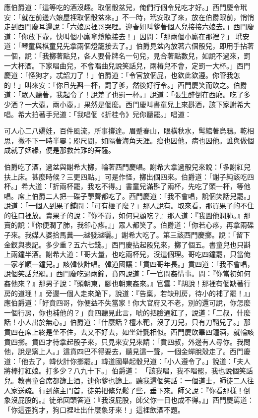應伯爵道：「這等吃的酒沒趣。取個骰盆兒，俺們行個令兒吃才好。」西門慶令玳安：「就在前邊六娘屋裡取個骰盆來。」不一時，玳安取了來，放在伯爵跟前，悄悄走到西門慶耳邊說：「六娘房裡哥哭哩。迎春姐叫爹著個人兒接接六娘去。」西門慶道：「你放下壺，快叫個小廝拿燈籠接去！」因問：「那兩個小廝在那裡？」 玳安道：「琴童與棋童兒先拿兩個燈籠接去了。」伯爵見盆內放著六個骰兒，即用手拈著一個，說：「我擲著點兒，各人要骨牌名一句兒，見合著點數兒，如說不過來，罰一大杯酒。下家唱曲兒，不會唱曲兒說笑話兒，兩樁兒不會，定罰一大杯。」西門慶道：「怪狗才，忒韶刀了！」伯爵道：「令官放個屁，也欽此欽遵。你管我怎的！」叫來安：「你且先斟一杯，罰了爹，然後好行令。」西門慶笑而飲之。伯爵道：「眾人聽著，我起令了！說差了也罰一杯。」說道：「張生醉倒在西廂。吃了多少酒？一大壺，兩小壺，」果然是個麼。西門慶叫書童兒上來斟酒，該下家謝希大唱。希大拍著手兒道：「我唱個《折桂令》兒你聽罷。」唱道：

可人心二八嬌娃，百件風流，所事撐達。眉蹙春山，眼橫秋水，髩綰著烏鴉。乾相思，撇不下一時半霎；咫尺間，如隔著海角天涯。瘦也因他，病也因他。誰與做個成就了姻緣，便是那救苦難的菩薩。

伯爵吃了酒，過盆與謝希大擲，輪著西門慶唱。謝希大拿過骰兒來說：「多謝紅兒扶上床。甚麼時候？三更四點。」可是作怪，擲出個四來。伯爵道：「謝子純該吃四杯。」希大道：「折兩杯罷，我吃不得。」書童兒滿斟了兩杯，先吃了頭一杯，等他唱。席上伯爵二人把一碟子荸薺都吃了。西門慶道：「我不會唱，說個笑話兒罷。」說道：「一個人到果子鋪問：「可有榧子麼？」那人說有。取來看，那買果子的不住的往口裡放。賣果子的說：『你不買，如何只顧吃？』那人道：『我圖他潤肺。』那賣的說：『你便潤了肺，我卻心疼。』」眾人都笑了。伯爵道：「你若心疼，再拿兩碟子來。我媒人婆拾馬糞──越發越曬。」謝希大吃了。第三該西門慶擲。說：「留下金釵與表記。多少重？五六七錢。」西門慶拈起骰兒來，擲了個五。書童兒也只斟上兩鐘半酒。謝希大道：「哥大量，也吃兩杯兒，沒這個理。哥吃四鐘罷，只當俺一家孝順一鐘兒。」該韓伙計唱。韓道國讓：「賁四哥年長。」賁四道：「我不會唱，說個笑話兒罷。」西門慶吃過兩鐘，賁四說道：「一官問姦情事。問：『你當初如何姦他來？』那男子說：『頭朝東，腳也朝東姦來。』官雲：『胡說！那裡有個缺著行房的道理！』旁邊一個人走來跪下，說道：『告稟，若缺刑房，待小的補了罷！』」應伯爵道：「好賁四哥，你便益不失當家！你大官府又不老，別的還可說，你怎麼一個行房，你也補他的？」賁四聽見此言，唬的把臉通紅了，說道：「二叔，什麼話！小人出於無心。」伯爵道：「什麼話？檀木靶，沒了刀兒，只有刀鞘兒了。」那賁四在席上終是坐不住，去又不好去，如坐針氈相似。西門慶飲畢四鐘酒，就輪該賁四擲。賁四才待拿起骰子來，只見來安兒來請：「賁四叔，外邊有人尋你。我問他，說是窯上人。」這賁四巴不得要去，聽見這一聲，一個金蟬脫殼走了。西門慶道：「他去了，韓伙計你擲罷。」韓道國舉起骰兒道：「小人遵令了。」說道：「夫人將棒打紅娘。打多少？八九十下。」伯爵道： 「該我唱，我不唱罷，我也說個笑話兒。教書童合席都篩上酒，連你爹也篩上。聽我這個笑話：一個道士，師徒二人往人家送疏。行到施主門首，徒弟把絛兒鬆了些，垂下來。師父說：『你看那樣！倒象沒屁股的。』徒弟回頭答道：『我沒屁股，師父你一日也成不得。』」西門慶罵道：「你這歪狗才，狗口裡吐出什麼象牙來！」這裡飲酒不題。

